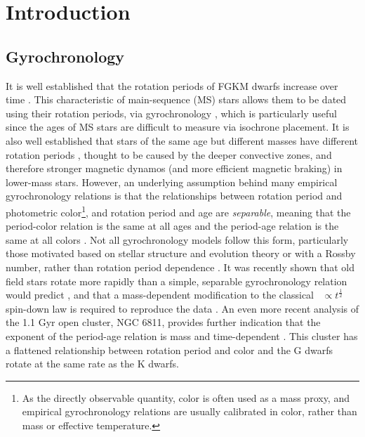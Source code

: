 \section{Introduction}

\subsection{Gyrochronology}
It is well established that the rotation periods of FGKM dwarfs increase over
time \citep{skumanich1972}.
This characteristic of main-sequence (MS) stars allows them to be dated using
their rotation periods, via gyrochronology \citep[\eg][]{kawaler1989,
pinsonneault1989, barnes2003, barnes2007, barnes2010, meibom2011, meibom2015},
which is particularly useful since the ages of MS stars are difficult to
measure via isochrone placement.
It is also well established that stars of the same age but different masses
have different rotation periods \citep[\eg][]{kraft1967, matt2012}, thought to
be caused by the deeper convective zones, and therefore stronger magnetic
dynamos (and more efficient magnetic braking) in lower-mass stars.
However, an underlying assumption behind many empirical gyrochronology
relations is that the relationships between rotation period and photometric
color\footnote{As the directly observable quantity, color is often used as a
mass proxy, and empirical gyrochronology relations are usually calibrated in
color, rather than mass or effective temperature.},
and rotation period and age are {\it separable}, meaning that the
period-color relation is the same at all ages and the period-age relation is
the same at all colors \citep[\eg][]{barnes2003, barnes2007, mamajek2008,
meibom2011, angus2015, angus2019}.
Not all gyrochronology models follow this form, particularly those motivated
based on stellar structure and evolution theory or with a Rossby number,
rather than rotation period dependence \citep[\eg][]{barnes2010, matt2012,
vansaders2016]}.
It was recently shown that old field stars rotate more rapidly than a simple,
separable gyrochronology relation would predict \citep{angus2015,
vansaders2016, vansaders2018, metcalfe2019}, and that a mass-dependent
modification to the classical \prot\ $\propto t^{\frac{1}{2}}$ spin-down law
\citep{skumanich1972} is required to reproduce the data \citep{vansaders2016,
vansaders2018}.
An even more recent analysis of the 1.1 Gyr open cluster, NGC 6811, provides
further indication that the exponent of the period-age relation is
mass and time-dependent \citep{curtis2019}.
This cluster has a flattened relationship between rotation period and color
and the G dwarfs rotate at the same rate as the K dwarfs.

